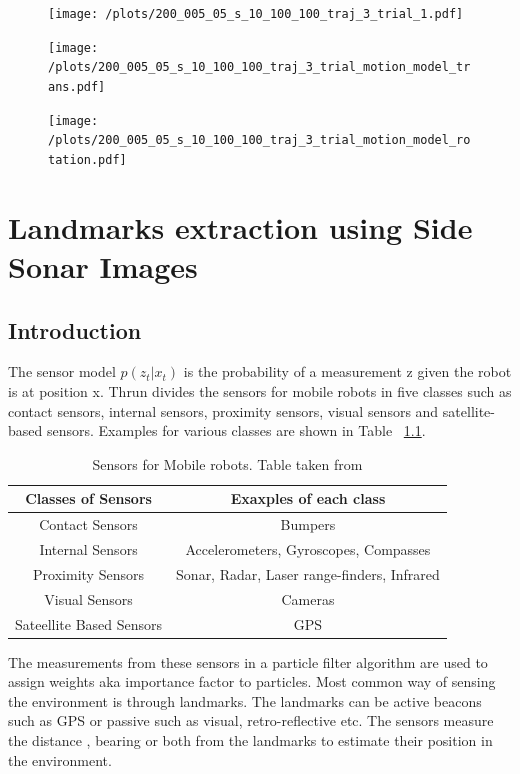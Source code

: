 \documentclass[12pt,draft]{dalcsthesis}
\begin{document}
\begin{figure}
  \centering
     {\texttt{[image: /plots/200\_005\_05\_s\_10\_100\_100\_traj\_3\_trial\_1.pdf]}}
  \caption{\label{fig-different sensor noise} }
\end{figure}

\begin{figure}
  \centering
     {\texttt{[image: /plots/200\_005\_05\_s\_10\_100\_100\_traj\_3\_trial\_motion\_model\_trans.pdf]}}
  \caption{\label{fig-different sensor noise motion model trans} }
\end{figure}

\begin{figure}
  \centering
     {\texttt{[image: /plots/200\_005\_05\_s\_10\_100\_100\_traj\_3\_trial\_motion\_model\_rotation.pdf]}}
  \caption{\label{fig-different sensor noise motion model trans} }
\end{figure}


\chapter{Landmarks extraction using Side Sonar Images}
\section{Introduction}
The sensor model $p(z_{t}|x_{t})$ is the probability of a measurement z given the robot is at position x. Thrun \cite{thrun2005probabilistic} divides the sensors for mobile robots in five classes such as contact sensors, internal sensors, proximity sensors, visual sensors and satellite-based sensors. Examples for various classes are shown in Table ~\ref{tab-: classes of sensors}.

\begin {table}[tbh]
\begin{tabular}{|c|c|}
\hline 
Classes of Sensors & Exaxples of each class \\ 
\hline 
Contact Sensors & Bumpers \\ 
\hline 
Internal Sensors & Accelerometers, Gyroscopes, Compasses \\ 
\hline 
Proximity Sensors & Sonar, Radar, Laser range-finders, Infrared \\ 
\hline 
Visual Sensors  & Cameras \\ 
\hline 
Sateellite Based Sensors & GPS \\ 
\hline 
\end{tabular}
\caption{\label{tab-: classes of sensors} Sensors for Mobile robots. Table taken from \cite{thrun2005probabilistic}}
\end{table}
The measurements from these sensors in a particle filter algorithm are used to assign weights aka importance factor to particles. Most common way of sensing the environment is through landmarks. The landmarks can be active beacons such as GPS or passive such as visual, retro-reflective etc. The sensors measure the distance , bearing or both from the landmarks to estimate their position in the environment. 
\end{document}
